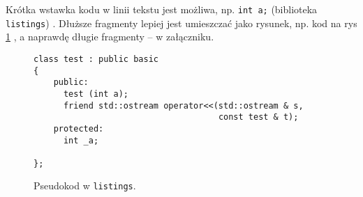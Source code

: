 Krótka wstawka kodu w linii tekstu jest możliwa, np.  \lstinline|int a;| (biblioteka \texttt{listings})%
. 
Dłuższe fragmenty lepiej jest umieszczać jako rysunek, np. kod na rys \ref{fig:pseudokod:listings}%
, a naprawdę długie fragmenty – w załączniku.


\begin{figure}
\centering
\begin{lstlisting}
class test : public basic
{
    public:
      test (int a);
      friend std::ostream operator<<(std::ostream & s, 
                                     const test & t);
    protected:
      int _a;  
      
};
\end{lstlisting}
\caption{Pseudokod w \texttt{listings}.}
\label{fig:pseudokod:listings}
\end{figure}

%      


